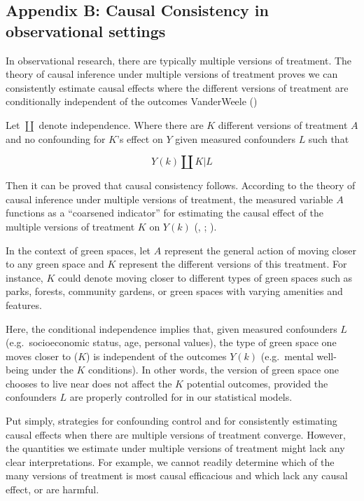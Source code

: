 \documentclass[
  singlecolumn]{article}
\begin{document}
\subsection{Appendix B: Causal Consistency in observational
settings}\label{appendix-b}

In observational research, there are typically multiple versions of
treatment. The theory of causal inference under multiple versions of
treatment proves we can consistently estimate causal effects where the
different versions of treatment are conditionally independent of the
outcomes VanderWeele ()

Let \(\coprod\) denote independence. Where there are \(K\) different
versions of treatment \(A\) and no confounding for \(K\)'s effect on
\(Y\) given measured confounders \(L\) such that

\[
Y(k) \coprod K | L
\]

Then it can be proved that causal consistency follows. According to the
theory of causal inference under multiple versions of treatment, the
measured variable \(A\) functions as a ``coarsened indicator'' for
estimating the causal effect of the multiple versions of treatment \(K\)
on \(Y(k)\) (,
;
).

In the context of green spaces, let \(A\) represent the general action
of moving closer to any green space and \(K\) represent the different
versions of this treatment. For instance, \(K\) could denote moving
closer to different types of green spaces such as parks, forests,
community gardens, or green spaces with varying amenities and features.

Here, the conditional independence implies that, given measured
confounders \(L\) (e.g.~socioeconomic status, age, personal values), the
type of green space one moves closer to (\(K\)) is independent of the
outcomes \(Y(k)\) (e.g.~mental well-being under the \(K\) conditions).
In other words, the version of green space one chooses to live near does
not affect the \(K\) potential outcomes, provided the confounders \(L\)
are properly controlled for in our statistical models.

Put simply, strategies for confounding control and for consistently
estimating causal effects when there are multiple versions of treatment
converge. However, the quantities we estimate under multiple versions of
treatment might lack any clear interpretations. For example, we cannot
readily determine which of the many versions of treatment is most causal
efficacious and which lack any causal effect, or are harmful.
\end{document}
